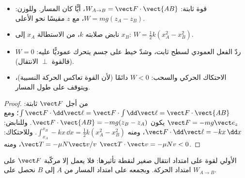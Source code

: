 \begin{proposition}\label{prop:b1:work-and-energy:works}
\begin{itemize}
  \item قوة ثابتة: $W_{A\to B} = \vect F\cdot\vect{AB}$، أيًّا كان
        المسار. وللوزن: $W = mg(z_A - z_B)$، مع $z$ مقيسًا نحو الأعلى.
  \item نابض صلابته $k$، من الاستطالة $x_A$ إلى $x_B$:
        $W = \tfrac12 k(x_A^2 - x_B^2)$.
  \item ردّ الفعل العمودي لسطح ثابت، وشدّ خيط على جسم
        يتحرك عموديًّا عليه: $W = 0$ (فالقوة $\perp$ الانتقال).
  \item الاحتكاك الحركي والسحب: $W < 0$ دائمًا (لأن القوة تعاكس
        الحركة النسبية)، ويتوقف  على طول المسار.
\end{itemize}
\end{proposition}

\begin{proof}
من أجل $\vect F$ ثابتة: $\int\vect F\cdot\dd\vect\ell = \vect F\cdot\int\dd\vect\ell
= \vect F\cdot\vect{AB}$؛ ومع $\vect F = -mg\vect e_z$ يكون $\vect F\cdot\vect{AB}
= -mg(z_B - z_A)$. وللنابض: $\vect F\cdot\dd\vect\ell = -kx\,\dd x$، ومنه
$\int_{x_A}^{x_B}-kx\,\dd x = \tfrac12 k(x_A^2 - x_B^2)$. وللاحتكاك: $\vect T
= -\mu N\vect v/v$، ومنه $\vect T\cdot\vect v = -\mu Nv < 0$.
\end{proof}

\begin{omfigure}

{\small {} الأولي لقوة على امتداد انتقال صغير
لنقطة تأثيرها: فلا يعمل إلا مركّبة $\vect F$ على امتداد
الحركة. وبجمعه على امتداد المسار من $A$ إلى $B$ نحصل على
$W_{A\to B}$.}
\end{omfigure}

